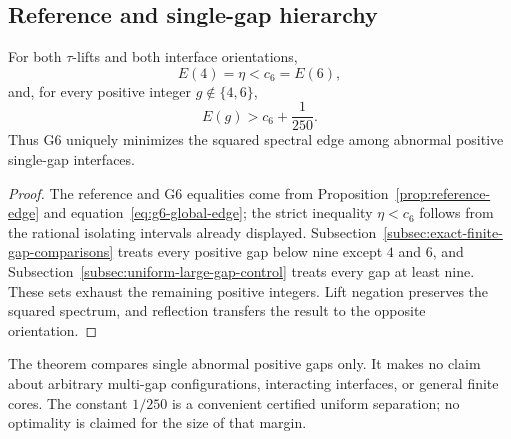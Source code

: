 \subsection{Reference and single-gap hierarchy}
\label{subsec:reference-single-gap-hierarchy}

\begin{theorem}
\label{thm:complete-single-gap}
For both \(\tau\)-lifts and both interface orientations,
\[
E(4)=\eta<c_6=E(6),
\]
and, for every positive integer \(g\notin\{4,6\}\),
\[
E(g)>c_6+\frac1{250}.
\]
Thus G6 uniquely minimizes the squared spectral edge among abnormal positive
single-gap interfaces.
\end{theorem}

\begin{proof}
The reference and G6 equalities come from
Proposition~\ref{prop:reference-edge} and
equation~\eqref{eq:g6-global-edge}; the strict inequality
\(\eta<c_6\) follows from the rational isolating intervals already displayed.
Subsection~\ref{subsec:exact-finite-gap-comparisons} treats every positive
gap below nine except \(4\) and \(6\), and
Subsection~\ref{subsec:uniform-large-gap-control} treats every gap at least
nine.  These sets exhaust the remaining positive integers.  Lift negation
preserves the squared spectrum, and reflection transfers the result to the
opposite orientation.
\end{proof}

The theorem compares single abnormal positive gaps only.  It makes no claim
about arbitrary multi-gap configurations, interacting interfaces, or
general finite cores.  The constant \(1/250\) is a convenient certified
uniform separation; no optimality is claimed for the size of that margin.

